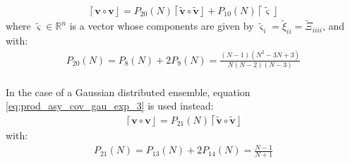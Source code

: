 \documentclass[12pt]{scrartcl}
\begin{document}
\begin{align}
\label{eq:prod_asy_var_exp_mu}
\left\lceil \mathbf{v} \circ \mathbf{v} \right\rfloor = P_{20}(N) \left\lceil\widetilde{\mathbf{v}} \circ \widetilde{\mathbf{v}}\right\rfloor + P_{10}(N) \left\lceil\widetilde{\boldsymbol{\varsigma}}\right\rfloor
\end{align}
where $\widetilde{\boldsymbol{\varsigma}} \in \mathbb{R}^n$ is a vector whose components are given by $\widetilde{\varsigma}_i = \widetilde{\xi}_{ii} = \widetilde{\Xi}_{iiii}$, and with:
\begin{align}
P_{20}(N) = P_8(N) + 2 P_9(N) =  \frac{(N-1)(N^2-3N+3)}{N(N-2)(N-3)}
\end{align}
$  $\\
In the case of a Gaussian distributed ensemble, equation \eqref{eq:prod_asy_cov_gau_exp_3} is used instead:
\begin{align}
\label{eq:prod_asy_var_gau_exp_mu}
\left\lceil \mathbf{v} \circ \mathbf{v} \right\rfloor = P_{21}(N) \left\lceil\widetilde{\mathbf{v}} \circ \widetilde{\mathbf{v}}\right\rfloor
\end{align}
with:
\begin{align}
P_{21}(N) = P_{13}(N) + 2 P_{14}(N) = \frac{N-1}{N+1}
\end{align}
\end{document}
